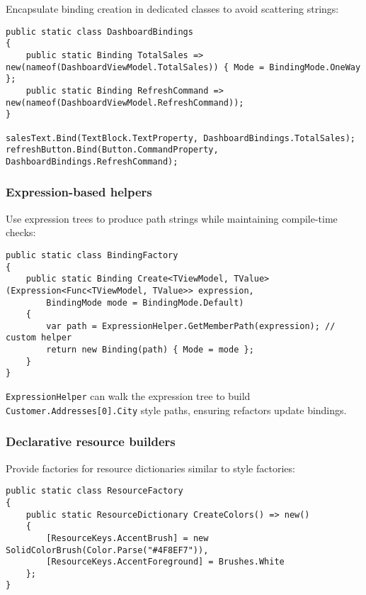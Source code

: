 Encapsulate binding creation in dedicated classes to avoid scattering
strings:

\begin{lstlisting}
public static class DashboardBindings
{
    public static Binding TotalSales => new(nameof(DashboardViewModel.TotalSales)) { Mode = BindingMode.OneWay };
    public static Binding RefreshCommand => new(nameof(DashboardViewModel.RefreshCommand));
}

salesText.Bind(TextBlock.TextProperty, DashboardBindings.TotalSales);
refreshButton.Bind(Button.CommandProperty, DashboardBindings.RefreshCommand);
\end{lstlisting}

\subsubsection{Expression-based helpers}\label{expression-based-helpers}

Use expression trees to produce path strings while maintaining
compile-time checks:

\begin{lstlisting}
public static class BindingFactory
{
    public static Binding Create<TViewModel, TValue>(Expression<Func<TViewModel, TValue>> expression,
        BindingMode mode = BindingMode.Default)
    {
        var path = ExpressionHelper.GetMemberPath(expression); // custom helper
        return new Binding(path) { Mode = mode };
    }
}
\end{lstlisting}

\passthrough{\lstinline!ExpressionHelper!} can walk the expression tree
to build \passthrough{\lstinline!Customer.Addresses[0].City!} style
paths, ensuring refactors update bindings.

\subsubsection{Declarative resource
builders}\label{declarative-resource-builders}

Provide factories for resource dictionaries similar to style factories:

\begin{lstlisting}
public static class ResourceFactory
{
    public static ResourceDictionary CreateColors() => new()
    {
        [ResourceKeys.AccentBrush] = new SolidColorBrush(Color.Parse("#4F8EF7")),
        [ResourceKeys.AccentForeground] = Brushes.White
    };
}
\end{lstlisting}

